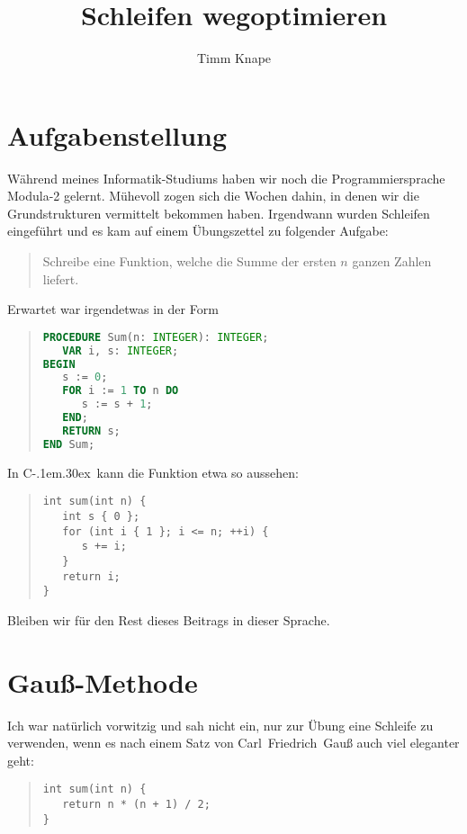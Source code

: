 \documentclass[a5paper,landscape,ngerman,10pt]{article}
\title{Schleifen wegoptimieren}
\author{Timm Knape}
\begin{document}
\newcommand{\cpp}{C\kern-.1em\raise.30ex\hbox{\smaller{++}}}
\lstset{columns=fullflexible, language=C++}
%
\maketitle
%
\section{Aufgabenstellung}
%
Während meines Informatik-Studiums haben wir noch die
Programmiersprache \hbox{\sc Modula-2} gelernt.
Mühevoll zogen sich die Wochen dahin, in denen wir die
Grundstrukturen vermittelt bekommen haben.
Irgendwann wurden Schleifen eingeführt und es kam auf
einem Übungszettel zu folgender Aufgabe:

\begin{quotation}
Schreibe eine Funktion, welche die 
Summe der ersten $n$ ganzen Zahlen liefert.
\end{quotation}

Erwartet war irgendetwas in der Form

\begin{quotation}
\begin{lstlisting}[language=Modula-2]
PROCEDURE Sum(n: INTEGER): INTEGER;
   VAR i, s: INTEGER;
BEGIN
   s := 0;
   FOR i := 1 TO n DO
      s := s + 1;
   END;
   RETURN s;
END Sum;
\end{lstlisting}
\end{quotation}

In \cpp\ kann die Funktion etwa so aussehen:

\begin{quotation}
\begin{lstlisting}
int sum(int n) {
   int s { 0 };
   for (int i { 1 }; i <= n; ++i) {
      s += i;
   }
   return i;
}
\end{lstlisting}
\end{quotation}

Bleiben wir für den Rest dieses Beitrags in dieser Sprache.

\section{Gauß-Methode}

Ich war natürlich vorwitzig und sah nicht ein,
nur zur Übung eine Schleife zu verwenden,
wenn es nach einem Satz von 
Carl~Friedrich~Gauß auch viel eleganter geht:

\begin{quotation}
\begin{lstlisting}
int sum(int n) {
   return n * (n + 1) / 2;
}
\end{lstlisting}
\end{quotation}
\end{document}
